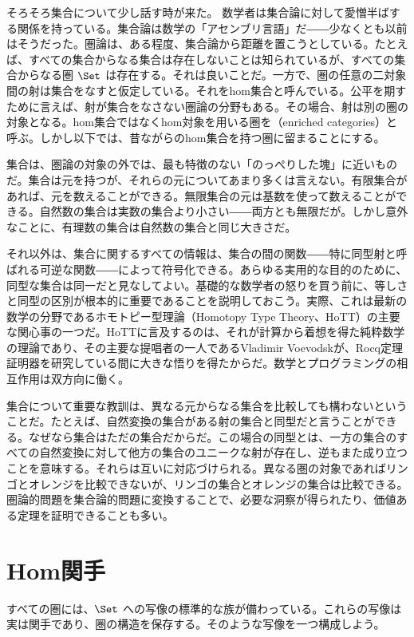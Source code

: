 
\lettrine[lhang=0.17]{そ}{ろそろ集合について少し話す時が来た。}
数学者は集合論に対して愛憎半ばする関係を持っている。集合論は数学の「アセンブリ言語」だ――少なくとも以前はそうだった。圏論は、ある程度、集合論から距離を置こうとしている。たとえば、すべての集合からなる集合は存在しないことは知られているが、すべての集合からなる圏 $\Set$ は存在する。それは良いことだ。一方で、圏の任意の二対象間の射は集合をなすと仮定している。それをhom集合と呼んでいる。公平を期すために言えば、射が集合をなさない圏論の分野もある。その場合、射は別の圏の対象となる。hom集合ではなくhom対象を用いる圏を（enriched categories）と呼ぶ。しかし以下では、昔ながらのhom集合を持つ圏に留まることにする。

集合は、圏論の対象の外では、最も特徴のない「のっぺりした塊」に近いものだ。集合は元を持つが、それらの元についてあまり多くは言えない。有限集合があれば、元を数えることができる。無限集合の元は基数を使って数えることができる。自然数の集合は実数の集合より小さい――両方とも無限だが。しかし意外なことに、有理数の集合は自然数の集合と同じ大きさだ。

それ以外は、集合に関するすべての情報は、集合の間の関数――特に同型射と呼ばれる可逆な関数――によって符号化できる。あらゆる実用的な目的のために、同型な集合は同一だと見なしてよい。基礎的な数学者の怒りを買う前に、等しさと同型の区別が根本的に重要であることを説明しておこう。実際、これは最新の数学の分野であるホモトピー型理論（Homotopy Type Theory、HoTT）の主要な関心事の一つだ。HoTTに言及するのは、それが計算から着想を得た純粋数学の理論であり、その主要な提唱者の一人であるVladimir Voevodskが、Rocq定理証明器を研究している間に大きな悟りを得たからだ。数学とプログラミングの相互作用は双方向に働く。

集合について重要な教訓は、異なる元からなる集合を比較しても構わないということだ。たとえば、自然変換の集合がある射の集合と同型だと言うことができる。なぜなら集合はただの集合だからだ。この場合の同型とは、一方の集合のすべての自然変換に対して他方の集合のユニークな射が存在し、逆もまた成り立つことを意味する。それらは互いに対応づけられる。異なる圏の対象であればリンゴとオレンジを比較できないが、リンゴの集合とオレンジの集合は比較できる。圏論的問題を集合論的問題に変換することで、必要な洞察が得られたり、価値ある定理を証明できることも多い。

\section{Hom関手}

すべての圏には、$\Set$ への写像の標準的な族が備わっている。これらの写像は実は関手であり、圏の構造を保存する。そのような写像を一つ構成しよう。

